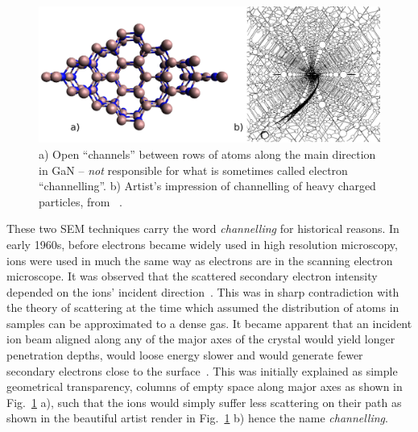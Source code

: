 \begin{figure}[!h]
    \centering
\includegraphics[width=1\linewidth]{Figures/channel2.png}
\caption[``Channels'']{ a) Open ``channels'' between rows of atoms along the main direction \hkl[001] in GaN -- \emph{not} responsible for what is sometimes called electron ``channelling''. b) Artist's impression of channelling of heavy charged particles, from~\cite{Brandt68} .}
\label{Fig:channels}
\end{figure}


These two SEM techniques carry the word \textit{channelling} for historical reasons. In early 1960s, before electrons became widely used in high resolution microscopy, ions were used in much the same way as electrons are in the scanning electron microscope. It was observed that the scattered secondary electron intensity depended on the ions' incident direction~\cite{Davies83}. This was in sharp contradiction with the 
theory of scattering at the time which assumed the distribution of atoms in samples can be approximated to a dense gas. It became apparent that an incident ion beam aligned along any of the major axes of the crystal would yield longer penetration depths, would loose energy slower and would generate fewer secondary electrons close to the surface~\cite{Piercy63}. This was initially explained as simple geometrical transparency, \ie columns of empty space along major axes as shown in Fig.~\ref{Fig:channels} a), such that the ions would simply suffer less scattering on their path as shown in the beautiful artist render in Fig.~\ref{Fig:channels} b) hence the name \textit{channelling}.


